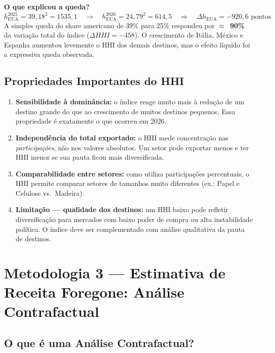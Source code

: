 \documentclass[12pt, a4paper]{article}
\begin{document}
\begin{exemplobox}
\medskip
\noindent\textbf{O que explicou a queda?}
\[
  h_{\text{EUA}}^{2025} = 39{,}18^2 = 1535{,}1
  \quad\longrightarrow\quad
  h_{\text{EUA}}^{2026} = 24{,}79^2 = 614{,}5
  \quad\Rightarrow\quad
  \Delta h_{\text{EUA}} = -920{,}6 \text{ pontos}
\]
A simples queda do share americano de 39\% para 25\% respondeu por
\textbf{$\approx$~90\%} da variação total do índice ($\Delta HHI = -458$).
O crescimento de Itália, México e Espanha aumentou levemente o HHI
dos demais destinos, mas o efeito líquido foi a expressiva queda observada.
\end{exemplobox}

\subsection{Propriedades Importantes do HHI}

\begin{enumerate}
  \item \textbf{Sensibilidade à dominância:} o índice reage muito mais à
    redução de um destino grande do que ao crescimento de muitos destinos
    pequenos. Essa propriedade é exatamente o que ocorreu em 2026.

  \item \textbf{Independência do total exportado:} o HHI mede concentração
    nas \emph{participações}, não nos valores absolutos. Um setor pode
    exportar menos e ter HHI menor se sua pauta ficou mais diversificada.

  \item \textbf{Comparabilidade entre setores:} como utiliza participações
    percentuais, o HHI permite comparar setores de tamanhos muito diferentes
    (ex.: Papel e Celulose vs.\ Madeira).

  \item \textbf{Limitação --- qualidade dos destinos:} um HHI baixo pode
    refletir diversificação para mercados com baixo poder de compra ou alta
    instabilidade política. O índice deve ser complementado com análise
    qualitativa da pauta de destinos.
\end{enumerate}

\section{Metodologia 3 --- Estimativa de Receita Foregone: Análise Contrafactual}
\label{sec:receita}

\subsection{O que é uma Análise Contrafactual?}
\end{document}
